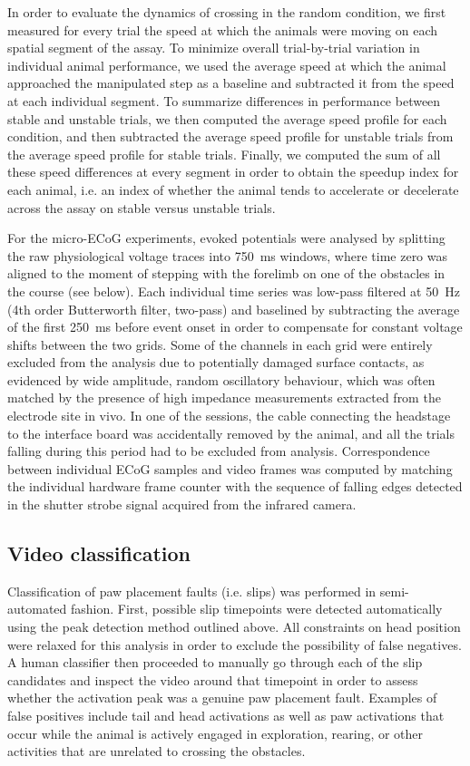 In order to evaluate the dynamics of crossing in the random condition, we first measured for every trial the speed at which the animals were moving on each spatial segment of the assay. To minimize overall trial-by-trial variation in individual animal performance, we used the average speed at which the animal approached the manipulated step as a baseline and subtracted it from the speed at each individual segment. To summarize differences in performance between stable and unstable trials, we then computed the average speed profile for each condition, and then subtracted the average speed profile for unstable trials from the average speed profile for stable trials. Finally, we computed the sum of all these speed differences at every segment in order to obtain the speedup index for each animal, i.e. an index of whether the animal tends to accelerate or decelerate across the assay on stable versus unstable trials.

For the micro-ECoG experiments, evoked potentials were analysed by splitting the raw physiological voltage traces into \SI{750}{\milli\second} windows, where time zero was aligned to the moment of stepping with the forelimb on one of the obstacles in the course (see below). Each individual time series was low-pass filtered at \SI{50}{\hertz} (4th order Butterworth filter, two-pass) and baselined by subtracting the average of the first \SI{250}{\milli\second} before event onset in order to compensate for constant voltage shifts between the two grids. Some of the channels in each grid were entirely excluded from the analysis due to potentially damaged surface contacts, as evidenced by wide amplitude, random oscillatory behaviour, which was often matched by the presence of high impedance measurements extracted from the electrode site in vivo. In one of the sessions, the cable connecting the headstage to the interface board was accidentally removed by the animal, and all the trials falling during this period had to be excluded from analysis. Correspondence between individual ECoG samples and video frames was computed by matching the individual hardware frame counter with the sequence of falling edges detected in the shutter strobe signal acquired from the infrared camera.

\subsection{Video classification}

Classification of paw placement faults (i.e. slips) was performed in semi-automated fashion. First, possible slip timepoints were detected automatically using the peak detection method outlined above. All constraints on head position were relaxed for this analysis in order to exclude the possibility of false negatives. A human classifier then proceeded to manually go through each of the slip candidates and inspect the video around that timepoint in order to assess whether the activation peak was a genuine paw placement fault. Examples of false positives include tail and head activations as well as paw activations that occur while the animal is actively engaged in exploration, rearing, or other activities that are unrelated to crossing the obstacles.

